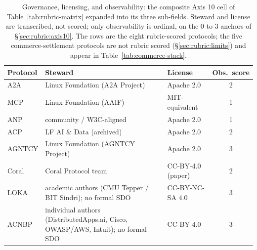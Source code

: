 
\begin{table}[t]
  \centering
  \caption{Governance, licensing, and observability: the composite Axis 10 cell of Table~\ref{tab:rubric-matrix} expanded into its three sub-fields. Steward and license are transcribed, not scored; only observability is ordinal, on the 0 to 3 anchors of \S\ref{sec:rubric:axis10}. The rows are the eight rubric-scored protocols; the five commerce-settlement protocols are not rubric scored (\S\ref{sec:rubric:limits}) and appear in Table~\ref{tab:commerce-stack}.}
  \label{tab:governance-license}
  \footnotesize
  \begin{tabular}{@{}p{}p{}p{}c@{}}
    \toprule
    Protocol & Steward & License & Obs.\ score \\
    \midrule
    A2A & Linux Foundation (A2A Project) & Apache 2.0 & 2 \\
    MCP & Linux Foundation (AAIF) & MIT-equivalent & 1 \\
    ANP & community / W3C-aligned & Apache 2.0 & 1 \\
    ACP & LF AI \& Data (archived) & Apache 2.0 & 2 \\
    AGNTCY & Linux Foundation (AGNTCY Project) & Apache 2.0 & 3 \\
    Coral & Coral Protocol team & CC-BY-4.0 (paper) & 2 \\
    LOKA & academic authors (CMU Tepper / BIT Sindri); no formal SDO & CC-BY-NC-SA 4.0 & 3 \\
    ACNBP & individual authors (DistributedApps.ai, Cisco, OWASP/AWS, Intuit); no formal SDO & CC-BY 4.0 & 3 \\
    \bottomrule
  \end{tabular}
\end{table}
